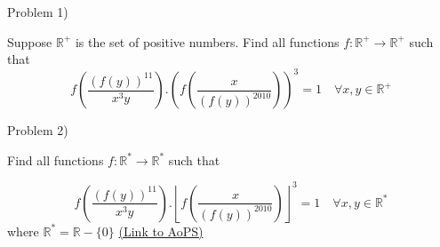 \begin{problem}
	\begin{bolded}Problem 1)\end{bolded}
 Suppose $\mathbb{R}^{+}$ is the set of positive numbers. 
Find all functions $f:\mathbb{R}^{+}\to\mathbb{R}^{+}$ such that
\[f\left(\frac{(f(y))^{11}}{x^3y}\right).\left(f(\frac{x}{(f(y))^{2010}})\right)^3=1\quad \forall x,y\in\mathbb{R}^+\]

\begin{bolded}Problem 2)\end{bolded} 
Find all functions $f:\mathbb{R}^*\to\mathbb{R}^*$ such that

\[f\left(\frac{(f(y))^{11}}{x^3y}\right).\left\lfloor f(\frac{x}{(f(y))^{2010}})\right\rfloor^3=1\quad \forall x,y\in\mathbb{R}^*\]
where $\mathbb{R}^*=\mathbb{R}- \{0\}$
	\flushright \href{https://artofproblemsolving.com/community/c6h570280}{(Link to AoPS)}
\end{problem}



